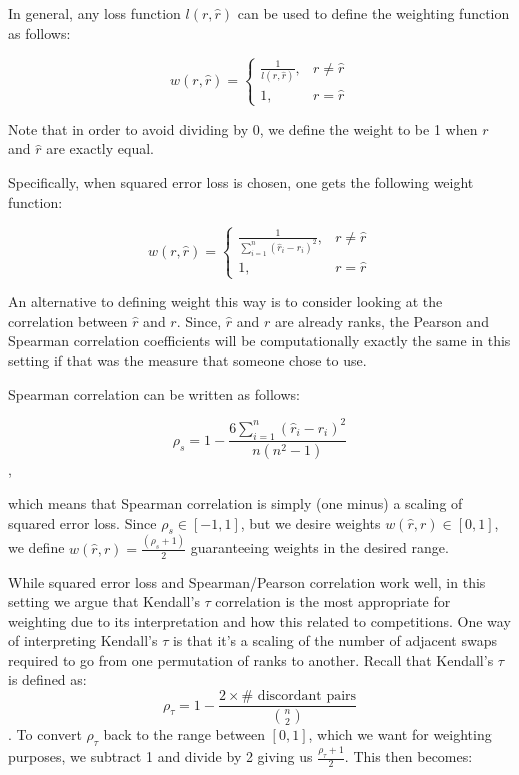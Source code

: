 \documentclass[
  12pt]{article}
\begin{document}
In general, any loss function \(l(r, \hat{r})\) can be used to define
the weighting function as follows:

\[
w(r, \hat{r}) =
\begin{cases}
\frac{1}{l(r, \hat{r})}, & r \ne \hat{r} \\
1, & r = \hat{r}
\end{cases}
\]

Note that in order to avoid dividing by 0, we define the weight to be 1
when \(r\) and \(\hat{r}\) are exactly equal.

Specifically, when squared error loss is chosen, one gets the following
weight function:

\[
w(r, \hat{r}) =
\begin{cases}
\frac{1}{\sum_{i=1}^n (\hat{r}_i - r_i)^2}, & r \ne \hat{r} \\
1, & r = \hat{r}
\end{cases}
\]

An alternative to defining weight this way is to consider looking at the
correlation between \(\hat{r}\) and \(r\). Since, \(\hat{r}\) and \(r\)
are already ranks, the Pearson and Spearman correlation coefficients
will be computationally exactly the same in this setting if that was the
measure that someone chose to use.

Spearman correlation can be written as follows:

\[
\rho_{s} =  1 - \frac{6  \sum_{i=1}^n (\hat{r}_i - r_i)^2}{n(n^2 - 1)}
\],

which means that Spearman correlation is simply (one minus) a scaling of
squared error loss. Since \(\rho_{s} \in [-1,1]\), but we desire weights
\(w(\hat{r},r) \in [0,1]\), we define
\(w(\hat{r},r) = \frac{(\rho_s + 1)}{2}\) guaranteeing weights in the
desired range.

While squared error loss and Spearman/Pearson correlation work well, in
this setting we argue that Kendall's \(\tau\) correlation is the most
appropriate for weighting due to its interpretation and how this related
to competitions. One way of interpreting Kendall's \(\tau\) is that it's
a scaling of the number of adjacent swaps required to go from one
permutation of ranks to another. Recall that Kendall's \(\tau\) is
defined as: \[
\rho_\tau = 1 - \frac{2 \times \# \text{ discordant pairs}}{{n \choose 2}}
\]. To convert \(\rho_\tau\) back to the range between \([0,1]\), which
we want for weighting purposes, we subtract 1 and divide by 2 giving us
\(\frac{\rho_\tau + 1}{2}\). This then becomes:
\end{document}
